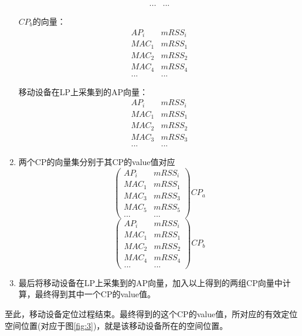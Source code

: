 \documentclass[UTF8, twocolumn ]{ctexart}
\begin{document}
\begin{enumerate}
\begin{displaymath}
\begin{array}{c|c}
... & ...
\end{array}
\end{displaymath}
\par
$CP_{b}$的向量：
\begin{displaymath}
\begin{array}{c|c}
AP_{i} & mRSS_{i} \\ \hline
MAC_{1} & mRSS_{1} \\
MAC_{2} & mRSS_{2} \\
MAC_{4} & mRSS_{4} \\
... & ...
\end{array}
\end{displaymath}
\par
移动设备在LP上采集到的AP向量：
\begin{displaymath}
\begin{array}{c|c}
AP_{i} & mRSS_{i} \\ \hline
MAC_{1} & mRSS_{1} \\
MAC_{2} & mRSS_{2} \\
MAC_{3} & mRSS_{3} \\
... & ...
\end{array}
\end{displaymath}
\item 两个CP的向量集分别于其CP的value值对应
\begin{displaymath}
\left(
\begin{array}{c|c}
AP_{i} & mRSS_{i} \\ \hline
MAC_{1} & mRSS_{1} \\
MAC_{3} & mRSS_{3} \\
MAC_{5} & mRSS_{5} \\
... & ...
\end{array}
\right)CP_{a}
\end{displaymath}
\begin{displaymath}
\left(
\begin{array}{c|c}
AP_{i} & mRSS_{i} \\ \hline
MAC_{1} & mRSS_{1} \\
MAC_{2} & mRSS_{2} \\
MAC_{4} & mRSS_{4} \\
... & ...
\end{array}
\right)CP_{b}
\end{displaymath}
\item 最后将移动设备在LP上采集到的AP向量，加入以上得到的两组CP向量中计算，最终得到其中一个CP的value值。
\end{enumerate}
\par
至此，移动设备定位过程结束。最终得到的这个CP的value值，所对应的有效定位空间位置(对应于图\ref{fig:3})，就是该移动设备所在的空间位置。
\end{document}
